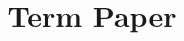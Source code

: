 \documentclass[a4paper, 12pt, oneside]{Front Page}
\begin{document}
\frontmatter	 
\title {\HUGE \bf{Term Paper}\linebreak }
\maketitle
\end{document}

